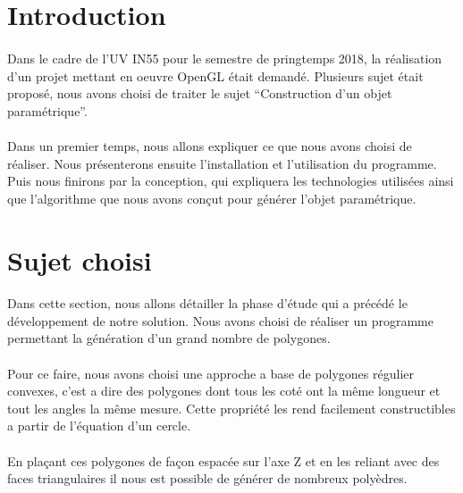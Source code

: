 \documentclass[article, backcover, french, nodocumentinfo]{upmethodology-document}
\begin{document}
	\thispagestyle{empty}
	\upmdocumentsummary{}
	\upmdocumentauthors{}
	\upmdocumentinformedpeople{}
	\upmpublicationpage{}
	\newpage{}
	\tableofcontents{}
	\newpage{}
	\section{Introduction}
		\paragraph*{}
			Dans le cadre de l'UV IN55 pour le semestre de pringtemps 2018, la réalisation d'un projet mettant en oeuvre OpenGL était demandé.
			Plusieurs sujet était proposé, nous avons choisi de traiter le sujet ``Construction d'un objet paramétrique''.
		\paragraph*{}
			Dans un premier temps, nous allons expliquer ce que nous avons choisi de réaliser.
			Nous présenterons ensuite l'installation et l'utilisation du programme.
			Puis nous finirons par la conception, qui expliquera les technologies utilisées ainsi que l'algorithme que nous avons conçut pour générer l'objet paramétrique.

	\section{Sujet choisi}
		\paragraph*{}
			Dans cette section, nous allons détailler la phase d'étude qui a précédé le développement de notre solution.
			Nous avons choisi de réaliser un programme permettant la génération d'un grand nombre de polygones.
		\paragraph*{}
			Pour ce faire, nous avons choisi une approche a base de polygones régulier convexes, c'est a dire des polygones dont tous les coté ont la même longueur et tout les angles la même mesure. Cette propriété les rend facilement constructibles a partir de l'équation d'un cercle.
		\paragraph*{}
			En plaçant ces polygones de façon espacée sur l'axe Z et en les reliant avec des faces triangulaires il nous est possible de générer de nombreux polyèdres.
\end{document}
